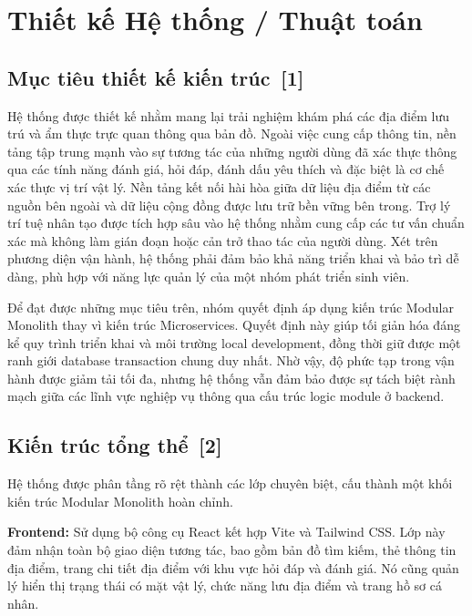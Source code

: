 \documentclass[12pt, a4paper]{article}
\begin{document}
\section{Thiết kế Hệ thống / Thuật toán}

\subsection[Mục tiêu thiết kế kiến trúc]{Mục tiêu thiết kế kiến trúc \,{\normalfont\small\textcolor{cyan!70!black}{[1]}}}
Hệ thống được thiết kế nhằm mang lại trải nghiệm khám phá các địa điểm lưu trú và ẩm thực trực quan thông qua bản đồ. Ngoài việc cung cấp thông tin, nền tảng tập trung mạnh vào sự tương tác của những người dùng đã xác thực thông qua các tính năng đánh giá, hỏi đáp, đánh dấu yêu thích và đặc biệt là cơ chế xác thực vị trí vật lý. Nền tảng kết nối hài hòa giữa dữ liệu địa điểm từ các nguồn bên ngoài và dữ liệu cộng đồng được lưu trữ bền vững bên trong. Trợ lý trí tuệ nhân tạo được tích hợp sâu vào hệ thống nhằm cung cấp các tư vấn chuẩn xác mà không làm gián đoạn hoặc cản trở thao tác của người dùng. Xét trên phương diện vận hành, hệ thống phải đảm bảo khả năng triển khai và bảo trì dễ dàng, phù hợp với năng lực quản lý của một nhóm phát triển sinh viên.

Để đạt được những mục tiêu trên, nhóm quyết định áp dụng kiến trúc Modular Monolith thay vì kiến trúc Microservices. Quyết định này giúp tối giản hóa đáng kể quy trình triển khai và môi trường local development, đồng thời giữ được một ranh giới database transaction chung duy nhất. Nhờ vậy, độ phức tạp trong vận hành được giảm tải tối đa, nhưng hệ thống vẫn đảm bảo được sự tách biệt rành mạch giữa các lĩnh vực nghiệp vụ thông qua cấu trúc logic module ở backend.

\subsection[Kiến trúc tổng thể]{Kiến trúc tổng thể \,{\normalfont\small\textcolor{cyan!70!black}{[2]}}}

Hệ thống được phân tầng rõ rệt thành các lớp chuyên biệt, cấu thành một khối kiến trúc Modular Monolith hoàn chỉnh.

\textbf{Frontend:}
Sử dụng bộ công cụ React kết hợp Vite và Tailwind CSS. Lớp này đảm nhận toàn bộ giao diện tương tác, bao gồm bản đồ tìm kiếm, thẻ thông tin địa điểm, trang chi tiết địa điểm với khu vực hỏi đáp và đánh giá. Nó cũng quản lý hiển thị trạng thái có mặt vật lý, chức năng lưu địa điểm và trang hồ sơ cá nhân.
\end{document}
